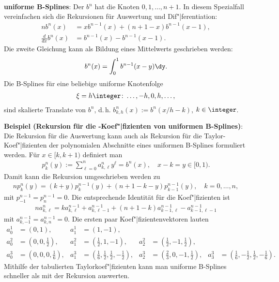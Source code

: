 \linie

\textbf{uniforme B-Splines}:
Der  $b^n$ hat die Knoten $0, 1, \dotsc, n + 1$.
In diesem Spezialfall vereinfachen sich die Rekursionen für Auswertung und Dif"|ferentiation:
\begin{align*}
    n b^n(x) &= xb^{n-1}(x) + (n + 1 - x)b^{n-1} (x - 1),\\
    \frac{d}{dx} b^n(x) &= b^{n-1}(x) - b^{n-1}(x - 1).
\end{align*}
Die zweite Gleichung kann als Bildung eines Mittelwerts geschrieben werden:
\begin{align*}
    b^n(x) = \int_0^1 b^{n-1}(x - y)\dy.
\end{align*}
Die B-Splines für eine beliebige uniforme Knotenfolge
\begin{align*}
    \xi = h\integer\colon \dotsc, -h, 0, h, \dotsc,
\end{align*}
sind skalierte Translate von $b^n$, d.\,h. $b_{k,h}^n(x) := b^n(x/h - k)$, $k \in \integer$.

\linie
\pagebreak

\textbf{Beispiel (Rekursion für die -Koef"|fizienten von uniformen B-Splines)}:\\
Die Rekursion für die Auswertung kann auch als Rekursion für die Taylor-Koef"|fizienten der
polynomialen Abschnitte eines uniformen B-Splines formuliert werden.
Für $x \in [k, k + 1)$ definiert man
\begin{align*}
    p_k^n(y) := \sum_{\ell=0}^n a_{k,\ell}^n y^\ell = b^n(x),\quad
    x - k = y \in [0, 1).
\end{align*}
Damit kann die Rekursion umgeschrieben werden zu
\begin{align*}
    np_k^n(y) = (k + y)p_k^{n-1}(y) + (n + 1 - k - y) p_{k-1}^{n-1}(y),\quad
    k = 0, \dotsc, n,
\end{align*}
mit $p_{-1}^{n-1} = p_n^{n-1} = 0$.
Die entsprechende Identität für die Koef"|fizienten ist
\begin{align*}
    n a_{k,\ell}^n = k a_{k,\ell}^{n-1} + a_{k,\ell-1}^{n-1} + (n + 1 - k) a_{k-1,\ell}^{n-1} -
    a_{k-1,\ell-1}^{n-1}
\end{align*}
mit $a_{k,-1}^{n-1} = a_{k,n}^{n-1} = 0$.
Die ersten paar Koef"|fizientenvektoren lauten
\begin{align*}
    a_0^1 &= \left(0, 1\right), &
    a_1^1 &= \left(1, -1\right),\\
    a_0^2 &= \left(0, 0, \frac{1}{2}\right), &
    a_1^2 &= \left(\frac{1}{2}, 1, -1\right), &
    a_2^2 &= \left(\frac{1}{2}, -1, \frac{1}{2}\right),\\
    a_0^3 &= \left(0, 0, 0, \frac{1}{6}\right), &
    a_1^3 &= \left(\frac{1}{6}, \frac{1}{2}, \frac{1}{2}, -\frac{1}{2}\right), &
    a_2^3 &= \left(\frac{2}{3}, 0, -1, \frac{1}{2}\right), &
    a_3^3 &= \left(\frac{1}{6}, -\frac{1}{2}, \frac{1}{2}, -\frac{1}{6}\right).
\end{align*}
Mithilfe der tabulierten Taylorkoef"|fizienten kann man uniforme B-Splines schneller als mit
der Rekursion auswerten.

